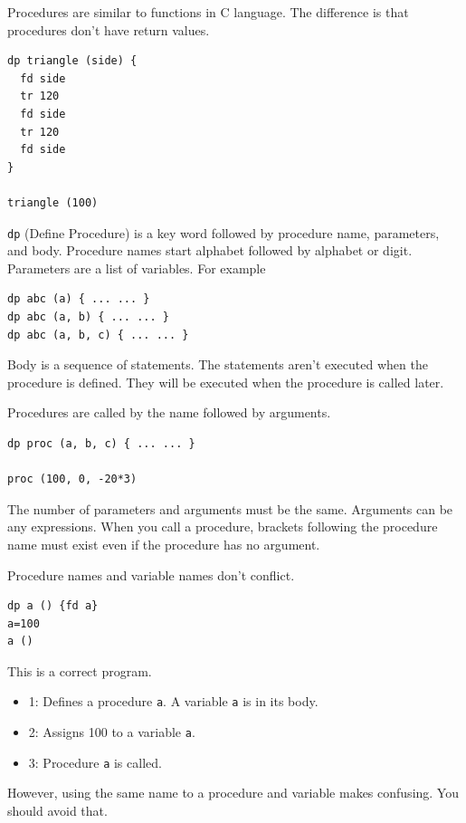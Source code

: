 Procedures are similar to functions in C language. The difference is
that procedures don't have return values.

\begin{lstlisting}
dp triangle (side) {
  fd side
  tr 120
  fd side
  tr 120
  fd side
}

triangle (100)
\end{lstlisting}

\passthrough{\lstinline!dp!} (Define Procedure) is a key word followed
by procedure name, parameters, and body. Procedure names start alphabet
followed by alphabet or digit. Parameters are a list of variables. For
example

\begin{lstlisting}
dp abc (a) { ... ... }
dp abc (a, b) { ... ... }
dp abc (a, b, c) { ... ... }
\end{lstlisting}

Body is a sequence of statements. The statements aren't executed when
the procedure is defined. They will be executed when the procedure is
called later.

Procedures are called by the name followed by arguments.

\begin{lstlisting}
dp proc (a, b, c) { ... ... }

proc (100, 0, -20*3)
\end{lstlisting}

The number of parameters and arguments must be the same. Arguments can
be any expressions. When you call a procedure, brackets following the
procedure name must exist even if the procedure has no argument.

Procedure names and variable names don't conflict.

\begin{lstlisting}
dp a () {fd a}
a=100
a ()
\end{lstlisting}

This is a correct program.

\begin{itemize}
\tightlist
\item
  1: Defines a procedure \passthrough{\lstinline!a!}. A variable
  \passthrough{\lstinline!a!} is in its body.
\item
  2: Assigns 100 to a variable \passthrough{\lstinline!a!}.
\item
  3: Procedure \passthrough{\lstinline!a!} is called.
\end{itemize}

However, using the same name to a procedure and variable makes
confusing. You should avoid that.

